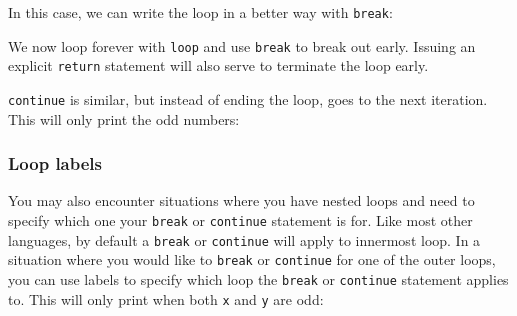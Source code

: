 \documentclass[a4paper,]{book}
\newenvironment{Shaded}{\begin{snugshade}}{\end{snugshade}}
\newcommand{\KeywordTok}[1]{\textcolor[rgb]{0.13,0.29,0.53}{\textbf{{#1}}}}
\newcommand{\DecValTok}[1]{\textcolor[rgb]{0.00,0.00,0.81}{{#1}}}
\newcommand{\StringTok}[1]{\textcolor[rgb]{0.31,0.60,0.02}{{#1}}}
\newcommand{\PreprocessorTok}[1]{\textcolor[rgb]{0.56,0.35,0.01}{\textit{{#1}}}}
\newcommand{\NormalTok}[1]{{#1}}
\begin{document}
In this case, we can write the loop in a better way with \texttt{break}:

\begin{Shaded}
\end{Shaded}

We now loop forever with \texttt{loop} and use \texttt{break} to break
out early. Issuing an explicit \texttt{return} statement will also serve
to terminate the loop early.

\texttt{continue} is similar, but instead of ending the loop, goes to
the next iteration. This will only print the odd numbers:

\begin{Shaded}
\end{Shaded}

\subsubsection{Loop labels}\label{loop-labels}

You may also encounter situations where you have nested loops and need
to specify which one your \texttt{break} or \texttt{continue} statement
is for. Like most other languages, by default a \texttt{break} or
\texttt{continue} will apply to innermost loop. In a situation where you
would like to \texttt{break} or \texttt{continue} for one of the outer
loops, you can use labels to specify which loop the \texttt{break} or
\texttt{continue} statement applies to. This will only print when both
\texttt{x} and \texttt{y} are odd:
\end{document}
